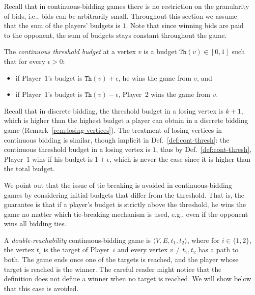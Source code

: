 \documentclass{article}\providecommand{\nequiv}{\not\equiv}\usepackage[a4paper,margin=20mm]{geometry}
\newcommand{\PO}{Player~$1$\xspace}
\newcommand{\PT}{Player~$2$\xspace}
\newcommand{\PLi}{Player~$i$\xspace}
\newcommand{\thresh}{\texttt{Th}\xspace}
\newcommand{\zug}[1]{\langle #1  \rangle}
\renewcommand{\set}[1]{\{ #1  \}}
\begin{document}
Recall that in continuous-bidding games there is no restriction on the granularity of bids, i.e., bids can be arbitrarily small. Throughout this section we assume that the sum of the players' budgets is $1$. Note that since winning bids are paid to the opponent, the sum of budgets stays constant throughout the game. 

\begin{definition}\label{def:cont-thresh}
The {\em continuous threshold budget} at a vertex $v$ is a budget $\thresh(v) \in [0,1]$ such that for every $\epsilon > 0$: 
\begin{itemize}
\item if \PO's budget is $\thresh(v) + \epsilon$, he wins the game from $v$, and 
\item if \PO's budget is $\thresh(v) - \epsilon$, \PT wins the game from $v$.
\end{itemize}
\end{definition}

\begin{remark}
Recall that in discrete bidding, the threshold budget in a losing vertex is $k+1$, which is higher than the highest budget a player can obtain in a discrete bidding game (Remark~\ref{rem:losing-vertices}). 
The treatment of losing vertices in continuous bidding is similar, though implicit in Def.~\ref{def:cont-thresh}: the continuous threshold budget in a losing vertex is $1$, thus by Def.~\ref{def:cont-thresh}, \PO wins if his budget is $1+\epsilon$, which is never the case since it is higher than the total budget. 
\end{remark}


\begin{remark}
We point out that the issue of tie breaking is avoided in continuous-bidding games by considering initial budgets that differ from the threshold. 
That is, the guarantee is that if a player's budget is strictly above the threshold, he wins the game no matter which tie-breaking mechanism is used, e.g., even if the opponent wins all bidding ties. 
\end{remark}

A {\em double-reachability} continuous-bidding game is $\zug{V, E, t_1, t_2}$, where for $i \in \set{1,2}$, the vertex $t_i$ is the target of \PLi and every vertex $v \neq t_1,t_2$ has a path to both. The game ends once one of the targets is reached, and the player whose target is reached is the winner. The careful reader might notice that the definition does not define a winner when no target is reached. We will show below that this case is avoided.
\end{document}
